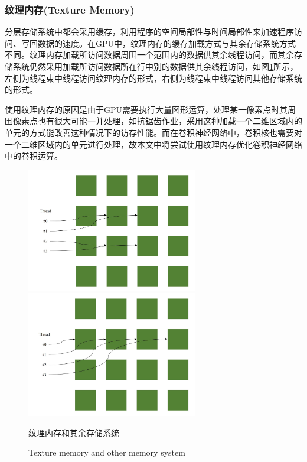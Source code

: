 \subsubsection{纹理内存(Texture Memory)}
\par 分层存储系统中都会采用缓存，利用程序的空间局部性与时间局部性来加速程序访问、写回数据的速度。在GPU中，纹理内存的缓存加载方式与其余存储系统方式不同。纹理内存加载所访问数据周围一个范围内的数据\parencite{THEDESIGN}供其余线程访问，而其余存储系统仍然采用加载所访问数据所在行中别的数据供其余线程访问，如图\ref{Fig.TextureAndGlobal}所示，左侧为线程束中线程访问纹理内存的形式，右侧为线程束中线程访问其他存储系统的形式。
\par 使用纹理内存的原因是由于GPU需要执行大量图形运算，处理某一像素点时其周围像素点也有很大可能一并处理，如抗锯齿作业，采用这种加载一个二维区域内的单元的方式能改善这种情况下的访存性能。而在卷积神经网络中，卷积核也需要对一个二维区域内的单元进行处理，故本文中将尝试使用纹理内存优化卷积神经网络中的卷积运算。
\begin{figure}
	\centering
	\includegraphics[width=7.5cm]{figures/TextureM.jpg}
	\includegraphics[width=7.5cm]{figures/GlobalM.jpg}
	\renewcommand{\thefigure}{\arabic{section}-\arabic{figure} }
	\renewcommand{\figurename}{图}
	\caption{纹理内存和其余存储系统}
	\addtocounter{figure}{-1}
	\renewcommand{\thefigure}{\arabic{section}-\arabic{figure} }
	\renewcommand{\figurename}{Figure}
	\caption{Texture memory and other memory system}
	\label{Fig.TextureAndGlobal}
\end{figure}
